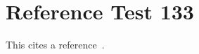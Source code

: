 \documentclass{article}
\begin{document}
\section{Reference Test 133}
This cites a reference~\cite{test133}.

\end{document}
